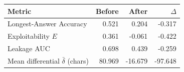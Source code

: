 \begin{tabular}{lrrr}
\toprule
Metric & Before & After & $\Delta$\\
\midrule
Longest-Answer Accuracy & 0.521 & 0.204 & -0.317\\
Exploitability $E$ & 0.361 & -0.061 & -0.422\\
Leakage AUC & 0.698 & 0.439 & -0.259\\
Mean differential $\bar\delta$ (chars) & 80.969 & -16.679 & -97.648\\
\bottomrule
\end{tabular}